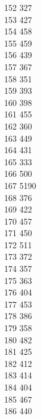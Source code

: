 { 152	327 \\
 153	427 \\
 154	458 \\
 155	459 \\
 156	439 \\
 157	367 \\
 158	351 \\
 159	393 \\
 160	398 \\
 161	455 \\
 162	360 \\
 163	449 \\
 164	431 \\
 165	333 \\
 166	500 \\
 167	5190 \\
 168	376 \\
 169	422 \\
 170	457 \\
 171	450 \\
 172	511 \\
 173	372 \\
 174	357 \\
 175	363 \\
 176	404 \\
 177	453 \\
 178	386 \\
 179	358 \\
 180	482 \\
 181	425 \\
 182	412 \\
 183	414 \\
 184	404 \\
 185	467 \\
 186	440 \\
}
